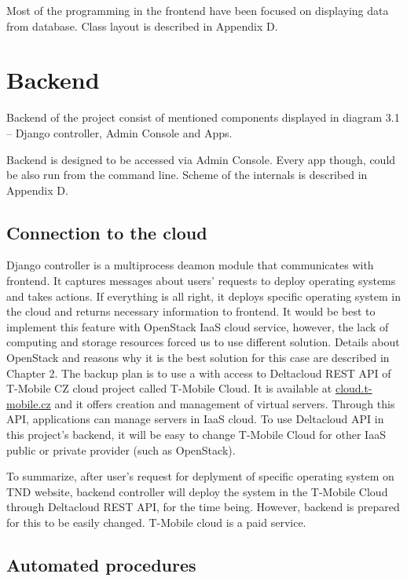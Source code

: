 \documentclass[thesis=B,english]{FITthesis}[2013/04/26]
\begin{document}
Most of the programming in the frontend have been focused on displaying data from database. Class layout is described in Appendix D.

\section{Backend}

Backend of the project consist of mentioned components displayed in diagram 3.1 -- Django controller, Admin Console and Apps.

Backend is designed to be accessed via Admin Console. Every app though, could be also run from the command line. Scheme of the internals is described in Appendix D.

\subsection{Connection to the cloud}

Django controller is a multiprocess deamon module that communicates with frontend. It captures messages about users' requests to deploy operating systems and takes actions. If everything is all right, it deploys specific operating system in the cloud and returns necessary information to frontend. It would be best to implement this feature with OpenStack IaaS cloud service, however, the lack of computing and storage resources forced us to use different solution. Details about OpenStack and reasons why it is the best solution for this case are described in Chapter 2. The backup plan is to use a  with access to Deltacloud REST API of T-Mobile CZ cloud project called T-Mobile Cloud. It is available at \url{cloud.t-mobile.cz} and it offers creation and management of virtual servers. Through this API, applications can manage servers in IaaS cloud. To use Deltacloud API in this project's backend, it will be easy to change T-Mobile Cloud for other IaaS public or private provider (such as OpenStack).

To summarize, after user's request for deplyment of specific operating system on TND website, backend controller will deploy the system in the T-Mobile Cloud through Deltacloud REST API, for the time being. However, backend is prepared for this to be easily changed. T-Mobile cloud is a paid service.

\subsection{Automated procedures}
\end{document}
